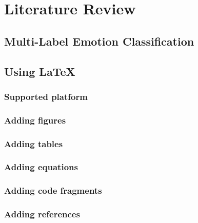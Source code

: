 
\chapter{Literature Review}

\section{Multi-Label Emotion Classification}


\section{Using \LaTeX{}}

\subsection{Supported platform}


\subsection{Adding figures}


\subsection{Adding tables}

  
\subsection{Adding equations}

\subsection{Adding code fragments}




\subsection{Adding references}

